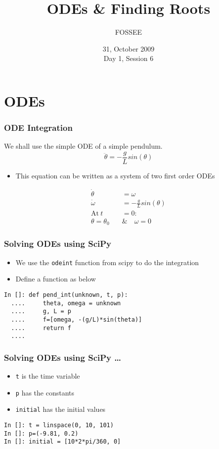 \documentclass[14pt,compress]{beamer}
\title[]{ODEs \& Finding Roots}
\author[FOSSEE] {FOSSEE}
\institute[IIT Bombay] {Department of Aerospace Engineering\\IIT Bombay}
\date[] {31, October 2009\\Day 1, Session 6}
\newcounter{time}
\newcommand{\typ}[1]{\lstinline{#1}}
\begin{document}
\begin{frame}
  \maketitle
\end{frame}


\section{ODEs}

\begin{frame}[fragile]
\frametitle{ODE Integration}
We shall use the simple ODE of a simple pendulum. 
\begin{equation*}
\ddot{\theta} = -\frac{g}{L}sin(\theta)
\end{equation*}
\begin{itemize}
\item This equation can be written as a system of two first order ODEs
\end{itemize}
\begin{align}
\dot{\theta} &= \omega \\
\dot{\omega} &= -\frac{g}{L}sin(\theta) \\
 \text{At}\ t &= 0 : \nonumber \\
 \theta = \theta_0\quad & \&\quad  \omega = 0 \nonumber
\end{align}
\end{frame}

\begin{frame}[fragile]
\frametitle{Solving ODEs using SciPy}
\begin{itemize}
\item We use the \typ{odeint} function from scipy to do the integration
\item Define a function as below
\end{itemize}
\begin{lstlisting}
In []: def pend_int(unknown, t, p):
  ....     theta, omega = unknown
  ....     g, L = p
  ....     f=[omega, -(g/L)*sin(theta)]
  ....     return f
  ....
\end{lstlisting}
\end{frame}

\begin{frame}[fragile]
\frametitle{Solving ODEs using SciPy \ldots}
\begin{itemize}
\item \typ{t} is the time variable \\ 
\item \typ{p} has the constants \\
\item \typ{initial} has the initial values
\end{itemize}
\begin{lstlisting}
In []: t = linspace(0, 10, 101)
In []: p=(-9.81, 0.2)
In []: initial = [10*2*pi/360, 0]
\end{lstlisting}
\end{frame}
\end{document}
